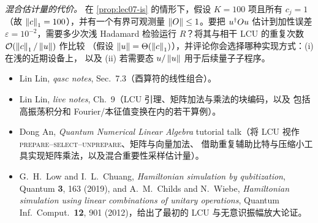 \begin{exercise}\label{ex:lec07-7}
\emph{混合估计量的代价。} 在 \cref{prop:lec07-is} 的情形下，假设
$K=100$ 项且所有 $c_j=1$（故 $\left\lVert c \right\rVert_1=100$），并有一个有界可观测量
$\left\lVert O \right\rVert\le1$。要把 $u^{\dagger} Ou$ 估计到加性误差 $\varepsilon=10^{-2}$，需要多少次浅
Hadamard 检验运行 $R$？将其与相干 LCU 的重复次数 $\mathcal{O}(\left\lVert c \right\rVert_1/\left\lVert u \right\rVert)$ 作比较
（假设 $\left\lVert u \right\rVert=\Theta(\left\lVert c \right\rVert_1)$），并评论你会选择哪种实现方式：(i) 在浅的近期设备上，
以及 (ii) 若需要态 $u/\left\lVert u \right\rVert$ 用于后续量子子程序。
\end{exercise}

\readingsection
\begin{itemize}[leftmargin=1.4em]
  \item Lin Lin, \emph{qasc notes}, Sec.~7.3（酉算符的线性组合）。
  \item Lin Lin, \emph{live notes}, Ch.~9（LCU 引理、矩阵加法与乘法的块编码，以及
        包括高振荡积分和 Fourier/本征值变换在内的若干算例）。
  \item Dong An, \emph{Quantum Numerical Linear Algebra} tutorial talk（将 LCU 视作
        \textsc{prepare}--\textsc{select}--\textsc{unprepare}、矩阵与向量加法、
        借助重复辅助比特与压缩小工具实现矩阵乘法，以及混合重要性采样估计量）。
  \item G.~H.~Low and I.~L.~Chuang, \emph{Hamiltonian simulation by qubitization},
        Quantum \textbf{3}, 163 (2019), and A.~M.~Childs and N.~Wiebe,
        \emph{Hamiltonian simulation using linear combinations of unitary
        operations}, Quantum Inf.\ Comput.\ \textbf{12}, 901 (2012)，给出了最初的
        LCU 与无意识振幅放大论证。
\end{itemize}
